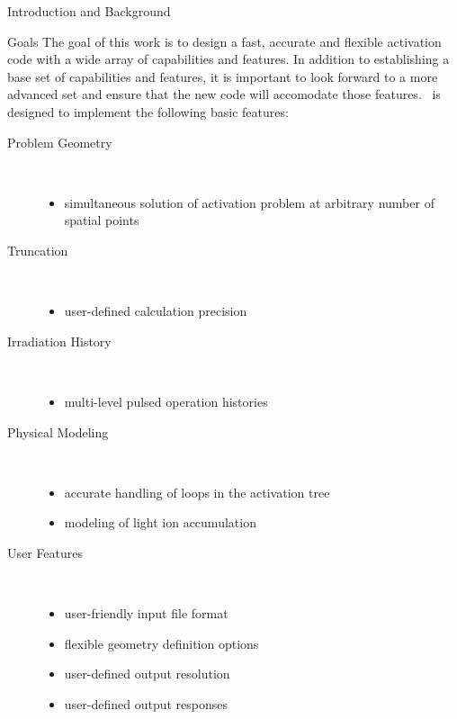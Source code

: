 \begin{chapter}{Introduction and Background}
\begin{section}{Goals}
    The goal of this work is to design a fast, accurate and flexible
    activation code with a wide array of capabilities and features.
    In addition to establishing a base set of capabilities and
    features, it is important to look forward to a more advanced set
    and ensure that the new code will accomodate those features.
    \ALARA\ is designed to implement the following basic features:
    \begin{description}
    \item[Problem Geometry]\ \\
      \vspace*{-1cm}
      \begin{itemize}
      \item simultaneous solution of activation problem at arbitrary
        number of spatial points
      \end{itemize}
    \item[Truncation]\ \\
      \vspace*{-1cm}
      \begin{itemize}
      \item user-defined calculation precision
      \end{itemize}
    \item[Irradiation History]\ \\
      \vspace*{-1cm}
      \begin{itemize}
      \item multi-level pulsed operation histories
      \end{itemize}
    \item[Physical Modeling]\ \\
      \vspace*{-1cm}
      \begin{itemize}
      \item accurate handling of loops in the activation tree
      \item modeling of light ion accumulation
      \end{itemize}
    \item[User Features]\ \\
      \vspace*{-1cm}
      \begin{itemize}
      \item user-friendly input file format
      \item flexible geometry definition options
      \item user-defined output resolution
      \item user-defined output responses
      \end{itemize}
    \end{description}


\end{section}
\end{chapter}
